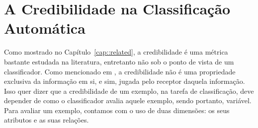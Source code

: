 \chapter{A Credibilidade na Classificação Automática} 
\label{cap::metodo}

Como mostrado no Capítulo~\ref{cap::related}, a credibilidade é uma métrica bastante estudada na literatura, entretanto não sob o ponto de vista de um classificador. Como mencionado em \cite{Sundar99}, a credibilidade não é uma propriedade exclusiva da informação em si, e sim, jugada pelo receptor daquela informação. Isso quer dizer que a credibilidade de um exemplo, na tarefa de classificação, deve depender de como o classificador avalia aquele exemplo, sendo portanto, variável. 
Para avaliar um exemplo, contamos com o uso de duas dimensões: os seus atributos e as suas relações.



